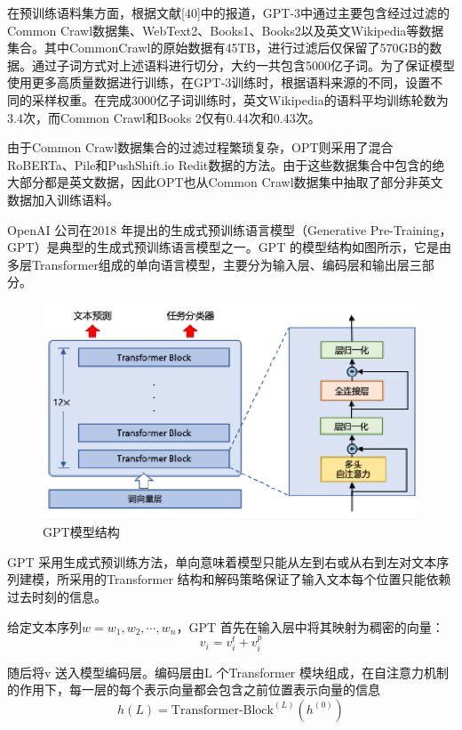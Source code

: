 \documentclass{article} %
\begin{document}
在预训练语料集方面，根据文献[40]中的报道，GPT-3中通过主要包含经过过滤的Common Crawl数据集、WebText2、Books1、Books2以及英文Wikipedia等数据集合。其中CommonCrawl的原始数据有45TB，进行过滤后仅保留了570GB的数据。通过子词方式对上述语料进行切分，大约一共包含5000亿子词。为了保证模型使用更多高质量数据进行训练，在GPT-3训练时，根据语料来源的不同，设置不同的采样权重。在完成3000亿子词训练时，英文Wikipedia的语料平均训练轮数为3.4次，而Common Crawl和Books 2仅有0.44次和0.43次。

由于Common Crawl数据集合的过滤过程繁琐复杂，OPT则采用了混合RoBERTa、Pile和PushShift.io Redit数据的方法。由于这些数据集合中包含的绝大部分都是英文数据，因此OPT也从Common Crawl数据集中抽取了部分非英文数据加入训练语料。

OpenAI 公司在2018 年提出的生成式预训练语言模型（Generative Pre-Training，GPT）是典型的生成式预训练语言模型之一。GPT 的模型结构如图所示，它是由多层Transformer组成的单向语言模型，主要分为输入层、编码层和输出层三部分。
\begin{figure}[h] %
    \centering %
    \includegraphics[width=\textwidth]{GPT模型结构.png} %
    \caption{GPT模型结构} %
    \label{fig:example} %
\end{figure}
\FloatBarrier

GPT 采用生成式预训练方法，单向意味着模型只能从左到右或从右到左对文本序列建模，所采用的Transformer 结构和解码策略保证了输入文本每个位置只能依赖过去时刻的信息。

给定文本序列$w=w_1,w_2,\cdots, w_n$，GPT 首先在输入层中将其映射为稠密的向量：
$$
v_i=v_i^t+v_i^p
$$

随后将v 送入模型编码层。编码层由L 个Transformer 模块组成，在自注意力机制的作用下，每一层的每个表示向量都会包含之前位置表示向量的信息
$$
h(L)=\text{Transformer-Block}^{(L)}(h^{(0)})
$$
\end{document}
